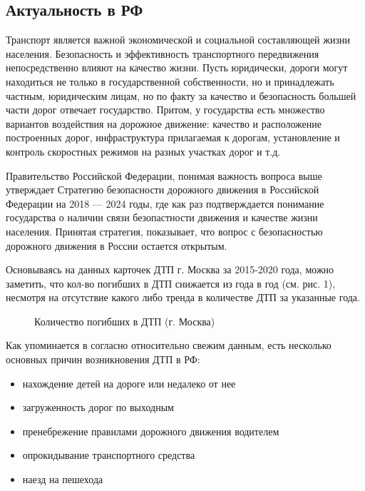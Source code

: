 \documentclass[a4paper, 14pt]{article}
\begin{document}
\subsection{Актуальность в РФ} 
Транспорт является важной экономической и социальной составляющей жизни населения. Безопасность и эффективность транспортного передвижения непосредственно влияют на качество жизни. Пусть юридически, дороги могут находиться не только в государственной собственности, но и принадлежать частным, юридическим лицам, но по факту за качество и безопасность большей части дорог отвечает государство. Притом, у государства есть множество вариантов воздействия на дорожное движение: качество и расположение построенных дорог, инфраструктура прилагаемая к дорогам, установление и контроль скоростных режимов на разных участках дорог и т.д. 

Правительство Российской Федерации, понимая важность вопроса выше утверждает Стратегию безопасности дорожного движения в Российской Федерации на 2018 --- 2024 годы, где как раз подтверждается понимание государства о наличии связи безопастности движения и качестве жизни населения. Принятая стратегия, показывает, что вопрос с безопасностью дорожного движения в России остается  открытым.

Основываясь на данных карточек ДТП г. Москва за 2015-2020 года, можно заметить, что кол-во погибших в ДТП снижается из года в год  (см. рис. 1), несмотря на отсутствие какого либо тренда в количестве ДТП за указанные года. %

\begin{figure}[h]\label{ris: pog_dynamics}
	\caption{Количество погибших в ДТП (г. Москва)}
\end{figure}

Как упоминается в \cite{kostych} согласно относительно свежим данным, есть несколько основных причин возникновения ДТП в РФ: 
\begin{itemize}
	\item нахождение детей на дороге или недалеко от нее
	\item загруженность дорог по выходным
	\item пренебрежение правилами дорожного движения водителем
	\item опрокидывание транспортного средства
	\item наезд на пешехода
\end{itemize}
\end{document}
